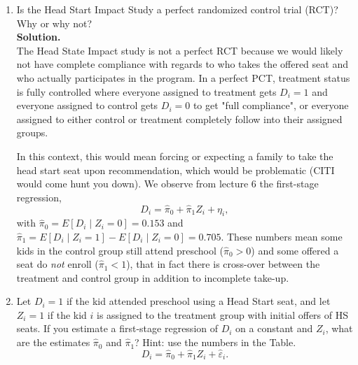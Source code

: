 \documentclass[12pt]{article}
\begin{document}
\begin{enumerate}[label=\textbf{(\alph*)}, leftmargin=1.5em]
  \item Is the Head Start Impact Study a perfect randomized control trial (RCT)? Why or why not?\\[0.5em]
  
  \textbf{Solution.} \\
  The Head State Impact study is not a perfect RCT because we would likely not have complete compliance with regards to who takes the offered seat and who actually participates in the program. In a perfect PCT, treatment status is fully controlled where everyone assigned to treatment gets $D_i = 1$ and everyone assigned to control gets $D_i =0$ to get "full compliance", or everyone assigned to either control or treatment completely follow into their assigned groups. 
  
  In this context, this would mean forcing or expecting a family to take the head start seat upon recommendation, which would be problematic (CITI would come hunt you down). We observe from lecture 6 the first-stage regression,
    \[
    D_i=\hat\pi_0+\hat\pi_1 Z_i+\eta_i,
    \]
    with \(\hat\pi_0=E[D_i\mid Z_i=0]=0.153\) and \(\hat\pi_1=E[D_i\mid Z_i=1]-E[D_i\mid Z_i=0]=0.705\). These numbers mean some kids in the control group still attend preschool (\(\hat\pi_0>0\)) and some offered a seat do \emph{not} enroll (\(\hat\pi_1<1\)), that in fact there is cross-over between the treatment and control group in addition to incomplete take-up.

  \item Let $D_i=1$ if the kid attended preschool using a Head Start seat, and let $Z_i=1$ if the kid $i$ is assigned to the treatment group with initial offers of HS seats. If you estimate a first-stage regression of $D_i$ on a constant and $Z_i$, what are the estimates $\hat{\pi}_0$ and $\hat{\pi}_1$? Hint: use the numbers in the Table.
  \[
    D_i = \hat{\pi}_0 + \hat{\pi}_1 Z_i + \hat{\varepsilon}_i.
  \]


\end{enumerate}
\end{document}
